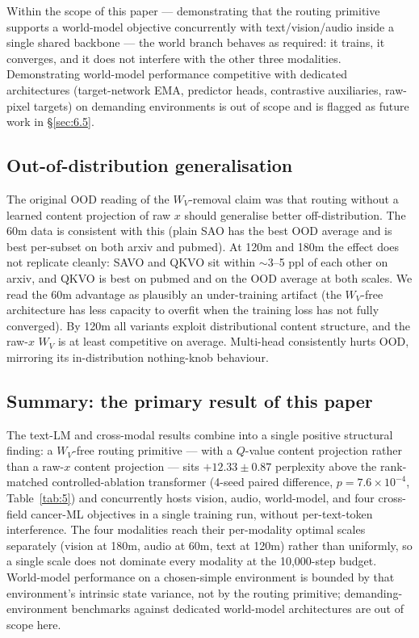 Within the scope of this paper --- demonstrating that the routing primitive supports a world-model objective concurrently with text/vision/audio inside a single shared backbone --- the world branch behaves as required: it trains, it converges, and it does not interfere with the other three modalities. Demonstrating world-model performance competitive with dedicated architectures (target-network EMA, predictor heads, contrastive auxiliaries, raw-pixel targets) on demanding environments is out of scope and is flagged as future work in \S\ref{sec:6.5}.

\subsection{Out-of-distribution generalisation}\label{sec:6.4}

The original OOD reading of the $W_V$-removal claim was that routing without a learned content projection of raw $x$ should generalise better off-distribution. The 60m data is consistent with this (plain SAO has the best OOD average and is best per-subset on both arxiv and pubmed). At 120m and 180m the effect does not replicate cleanly: SAVO and QKVO sit within ${\sim}$3--5 ppl of each other on arxiv, and QKVO is best on pubmed and on the OOD average at both scales. We read the 60m advantage as plausibly an under-training artifact (the $W_V$-free architecture has less capacity to overfit when the training loss has not fully converged). By 120m all variants exploit distributional content structure, and the raw-$x$ $W_V$ is at least competitive on average. Multi-head consistently hurts OOD, mirroring its in-distribution nothing-knob behaviour.

\subsection*{Summary: the primary result of this paper}

The text-LM and cross-modal results combine into a single positive structural finding: a $W_V$-free routing primitive --- with a $Q$-value content projection rather than a raw-$x$ content projection --- sits $+12.33\pm0.87$ perplexity above the rank-matched controlled-ablation transformer (4-seed paired difference, $p = 7.6 \times 10^{-4}$, Table~\ref{tab:5}) and concurrently hosts vision, audio, world-model, and four cross-field cancer-ML objectives in a single training run, without per-text-token interference. The four modalities reach their per-modality optimal scales separately (vision at 180m, audio at 60m, text at 120m) rather than uniformly, so a single scale does not dominate every modality at the 10,000-step budget. World-model performance on a chosen-simple environment is bounded by that environment's intrinsic state variance, not by the routing primitive; demanding-environment benchmarks against dedicated world-model architectures are out of scope here.

